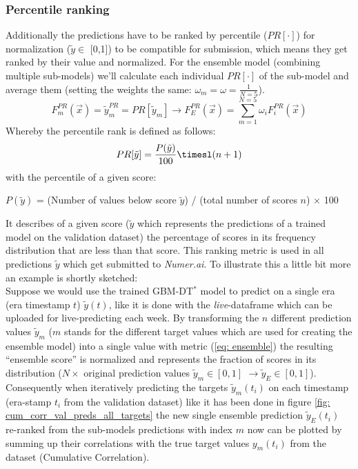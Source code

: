 \documentclass[12pt, a4paper]{article}
\begin{document}
\subsubsection{Percentile ranking}
Additionally the predictions have to be ranked by percentile ($PR[\cdot]$) for normalization ($\tilde{y} \in$ [0,1]) to be compatible for submission, which means they get ranked by their value and normalized. For the ensemble model (combining multiple sub-models) we'll calculate each individual $PR[\cdot]$ of the sub-model and average them (setting the weights the same: $\omega_m = \omega = \frac{1}{N=5}$).
\begin{equation}
    \label{eq: ensemble}
    F^{PR}_m(\vec{x}) = \tilde{y}^{PR}_m = PR[\tilde{y}_m] \rightarrow F^{PR}_E(\vec{x}) = \sum_{m=1}^{N=5}  \omega_i F^{PR}_i(\vec{x})
\end{equation}
Whereby the percentile rank is defined as follows:
\begin{equation}
    \label{eq: pr}
    PR[\tilde{y}] = \frac{P(\tilde{y})}{100} \timesl (n + 1)
\end{equation}
with the percentile of a given score:
\begin{center}
    $P(\tilde{y})$ = (Number of values below score $\tilde{y}$) / (total number of scores $n$) $\times$ 100
\end{center}
It describes of a given score ($\tilde{y}$ which represents the predictions of a trained model on the validation dataset) the percentage of scores in its frequency distribution that are less than that score. This ranking metric is used in all predictions $\tilde{y}$ which get submitted to \textit{Numer.ai}. To illustrate this a little bit more an example is shortly sketched: \\
Suppose we would use the trained GBM-DT$^{\ast}$ model to predict on a single era (era timestamp $t$) $\tilde{y}(t)$, like it is done with the \textit{live}-dataframe which can be uploaded for live-predicting each week.
By transforming the $n$ different prediction values $\tilde{y}_m$ ($m$ stands for the different target values which are used for creating the ensemble model) into a single value with metric (\ref{eq: ensemble}) the resulting ``ensemble score'' is normalized and represents the fraction of scores in its distribution ($N \times$ original prediction values $\tilde{y}_m \in [0,1]$ $\rightarrow \tilde{y}_E \in [0,1]$). Consequently when iteratively predicting the targets $\tilde{y}_m(t_i)$ on each timestamp (era-stamp $t_i$ from the validation dataset) like it has been done in figure \ref{fig: cum_corr_val_preds_all_targets} the new single ensemble prediction $\tilde{y}_E(t_i)$ re-ranked from the sub-models predictions with index $m$ now can be plotted by summing up their correlations with the true target values $y_m(t_i)$ from the dataset (Cumulative Correlation). \\
\end{document}
